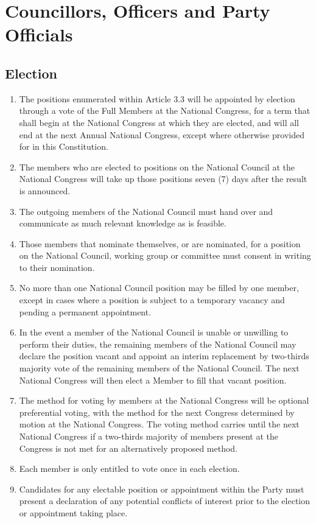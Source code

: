 \documentclass[a4paper,titlepage,8.5pt]{article}
\begin{document}
\section{Councillors, Officers and Party Officials}

\subsection{Election}

\begin{enumerate}
\item The positions enumerated within Article 3.3 will be appointed by election through a vote of the Full Members at the National Congress, for a term that shall begin at the National Congress at which they are elected, and will all end at the next Annual National Congress, except where otherwise provided for in this Constitution.
\item The members who are elected to positions on the National Council at the National Congress will take up those positions seven (7) days after the result is announced.
\item The outgoing members of the National Council must hand over and communicate as much relevant knowledge as is feasible.
\item Those members that nominate themselves, or are nominated, for a position on the National Council, working group or committee must consent in writing to their nomination.
\item No more than one National Council position may be filled by one member, except in cases where a position is subject to a temporary vacancy and pending a permanent appointment.
\item In the event a member of the National Council is unable or unwilling to perform their duties, the remaining members of the National Council may declare the position vacant and appoint an interim replacement by two-thirds majority vote of the remaining members of the National Council. The next National Congress will then elect a Member to fill that vacant position.
\item The method for voting by members at the National Congress will be optional preferential voting, with the method for the next Congress determined by motion at the National Congress. The voting method carries until the next National Congress if a two-thirds majority of members present at the Congress is not met for an alternatively proposed method.
\item Each member is only entitled to vote once in each election.
\item Candidates for any electable position or appointment within the Party must present a declaration of any potential conflicts of interest prior to the election or appointment taking place.
\end{enumerate}
\end{document}
